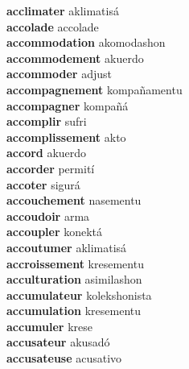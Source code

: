 \textbf{acclimater } aklimatisá \\
\textbf{accolade } accolade \\
\textbf{accommodation } akomodashon \\
\textbf{accommodement } akuerdo \\
\textbf{accommoder } adjust \\
\textbf{accompagnement } kompañamentu \\
\textbf{accompagner } kompañá \\
\textbf{accomplir } sufri \\
\textbf{accomplissement } akto \\
\textbf{accord } akuerdo \\
\textbf{accorder } permití \\
\textbf{accoter } sigurá \\
\textbf{accouchement } nasementu \\
\textbf{accoudoir } arma \\
\textbf{accoupler } konektá \\
\textbf{accoutumer } aklimatisá \\
\textbf{accroissement } kresementu \\
\textbf{acculturation } asimilashon \\
\textbf{accumulateur } kolekshonista \\
\textbf{accumulation } kresementu \\
\textbf{accumuler } krese \\
\textbf{accusateur } akusadó \\
\textbf{accusateuse } acusativo \\
